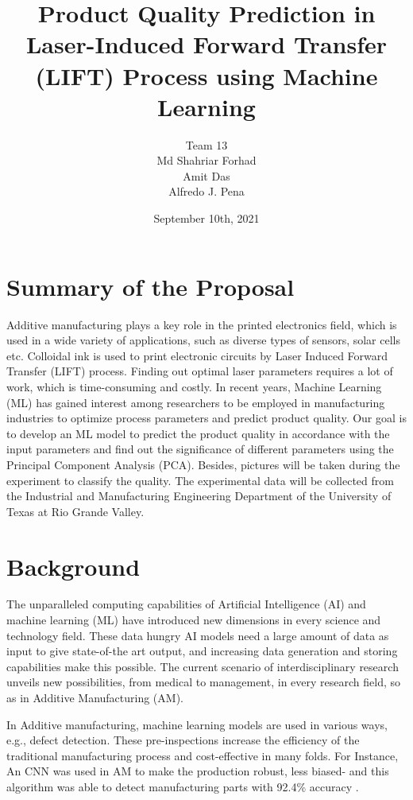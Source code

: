 \documentclass[letterpaper]{article}
\title{Product Quality Prediction in Laser-Induced Forward Transfer (LIFT) Process using Machine Learning}
\author{Team 13 \\ Md Shahriar Forhad\\Amit Das\\Alfredo J. Pena}
\date{September 10th, 2021}
\begin{document}
\maketitle

\section*{Summary of the Proposal}
Additive manufacturing plays a key role in the printed electronics field, which is used in a wide variety of applications, such as diverse types of sensors, solar cells etc. Colloidal ink is used to print electronic circuits by Laser Induced Forward Transfer (LIFT) process. Finding out optimal laser parameters requires a lot of work, which is time-consuming and costly. In recent years, Machine Learning (ML) has gained interest among researchers to be employed in manufacturing industries to optimize process parameters and predict product quality. Our goal is to develop an ML model to predict the product quality in accordance with the input parameters and find out the significance of different parameters using the Principal Component Analysis (PCA). Besides, pictures will be taken during the experiment to classify the quality. The experimental data will be collected from the Industrial and Manufacturing Engineering Department of the University of Texas at Rio Grande Valley.

\section*{Background}
The unparalleled computing capabilities of Artificial Intelligence (AI) and machine learning (ML) have introduced new dimensions in every science and technology field. These data hungry AI models need a large amount of data as input to give state-of-the art output, and increasing data generation and storing capabilities make this possible. The current scenario of interdisciplinary research unveils new possibilities, from medical to management, in every research field, so as in Additive Manufacturing (AM).\par
In Additive manufacturing, machine learning models are used in various ways, e.g., defect detection. These pre-inspections increase the efficiency of the traditional manufacturing process and cost-effective in many folds. For Instance, An CNN was used in AM to make the production robust, less biased- and this algorithm was able to detect manufacturing parts with 92.4\% accuracy \parencite[]{cui}.
\end{document}
